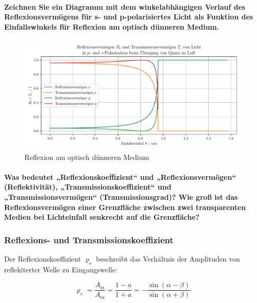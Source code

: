 \documentclass[a4paper, 11pt, ngerman, parskip=half]{scrartcl}
\begin{document}
\paragraph{Zeichnen Sie ein Diagramm mit dem winkelabhängigen Verlauf des Reflexionsvermögens für s-
und p-polarisiertes Licht als Funktion des Einfallswinkels für Reflexion am optisch dünneren
Medium.}
\phantom{}
\begin{figure}[H]
    \centering
    \begin{samepage}
        \includegraphics[width=\textwidth]{image/15/Quarz_zu_Luft.pdf}
        \caption{Reflexion am optisch dünneren Medium}
        \label{fig:reflexion_duenn}
    \end{samepage}
\end{figure}

\paragraph{Was bedeutet „Reflexionskoeffizient“ und „Reflexionsvermögen“ (Reflektivität),
„Transmissionskoeffizient“ und „Transmissionsvermögen“ (Transmissionsgrad)? Wie groß ist das
Reflexionsvermögen einer Grenzfläche zwischen zwei transparenten Medien bei Lichteinfall senkrecht
auf die Grenzfläche?}

\subsubsection*{Reflexions- und Transmissionskoeffizient}
Der Reflexionskoeffizient $\varrho_s$ beschreibt das Verhältnis der Amplituden von reflekiterter Welle zu Eingangswelle:

\begin{equation}
    \label{eq:reflexionskoeffizient}
    \varrho_s = \frac{A_{\text{rs}}}{A_{\text{es}}} = \frac{1-a}{1+a} = -\frac{\sin (\alpha - \beta)}{\sin (\alpha + \beta)}
\end{equation}
\end{document}
